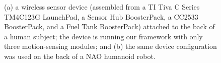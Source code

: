 \documentclass{IEEEtran}
\begin{document}
%





\begin{figure}[htb]
\centering
{}
\qquad
{} 
\caption{(a) a wireless sensor device (assembled from a TI Tiva C Series  TM4C123G LaunchPad, a Sensor Hub BoosterPack, a CC2533 BoosterPack, and a Fuel Tank BoosterPack) attached to the back of a human subject; the device is running our framework  with only three motion-sensing modules; and (b) the 
same device configuration was used on the back of a NAO humanoid robot.}
 \label{fig:deviceWithSubjects}
\end{figure}
\end{document}

